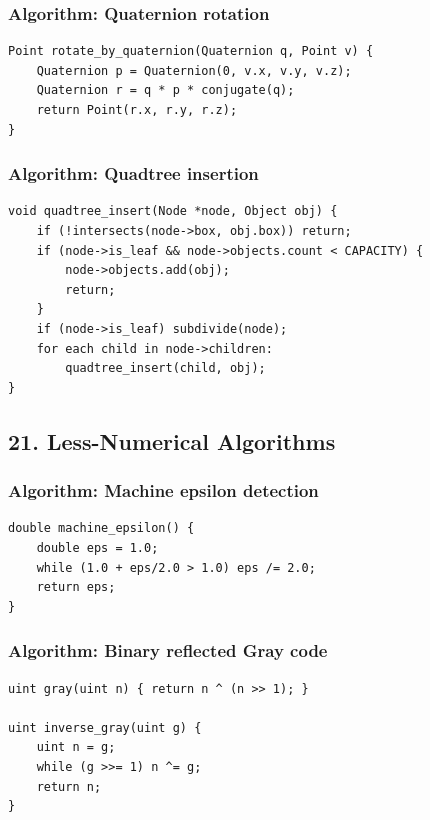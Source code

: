 \documentclass[11pt]{article}
\begin{document}
\subsubsection{Algorithm: Quaternion rotation}\label{algorithm-quaternion-rotation}

\begin{verbatim}
Point rotate_by_quaternion(Quaternion q, Point v) {
    Quaternion p = Quaternion(0, v.x, v.y, v.z);
    Quaternion r = q * p * conjugate(q);
    return Point(r.x, r.y, r.z);
}
\end{verbatim}

\subsubsection{Algorithm: Quadtree insertion}\label{algorithm-quadtree-insertion}

\begin{verbatim}
void quadtree_insert(Node *node, Object obj) {
    if (!intersects(node->box, obj.box)) return;
    if (node->is_leaf && node->objects.count < CAPACITY) {
        node->objects.add(obj);
        return;
    }
    if (node->is_leaf) subdivide(node);
    for each child in node->children:
        quadtree_insert(child, obj);
}
\end{verbatim}

\subsection{21. Less-Numerical Algorithms}\label{less-numerical-algorithms}

\subsubsection{Algorithm: Machine epsilon detection}\label{algorithm-machine-epsilon-detection}

\begin{verbatim}
double machine_epsilon() {
    double eps = 1.0;
    while (1.0 + eps/2.0 > 1.0) eps /= 2.0;
    return eps;
}
\end{verbatim}

\subsubsection{Algorithm: Binary reflected Gray code}\label{algorithm-binary-reflected-gray-code}

\begin{verbatim}
uint gray(uint n) { return n ^ (n >> 1); }

uint inverse_gray(uint g) {
    uint n = g;
    while (g >>= 1) n ^= g;
    return n;
}
\end{verbatim}
\end{document}
